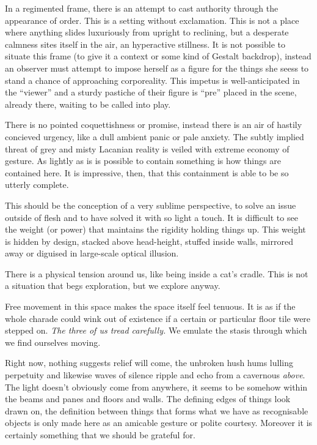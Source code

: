\documentclass{book}
\begin{document}
In a regimented frame, there is an attempt to cast authority through the
appearance of order. This is a setting without exclamation. This is not a place
where anything slides luxuriously from upright to reclining, but a desperate
calmness sites itself in the air, an hyperactive stillness. It is not possible
to situate this frame (to give it a context or some kind of Gestalt backdrop),
instead an observer must attempt to impose herself as a figure for the things
she seess to stand a chance of approaching corporeality. This impetus is
well-anticipated in the ``viewer'' and a sturdy pastiche of their figure is
``pre'' placed in the scene, already there, waiting to be called into play.

There is no pointed coquettishness or promise, instead there is an air of
hastily concieved urgency, like a dull ambient panic or pale anxiety. The
subtly implied threat of grey and misty Lacanian reality is veiled with extreme
economy of gesture. As lightly as is is possible to contain something is how
things are contained here. It is impressive, then, that this containment is
able to be so utterly complete.

This should be the conception of a very sublime perspective, to solve an issue
outside of flesh and to have solved it with so light a touch. It is difficult
to see the weight (or power) that maintains the rigidity holding things up.
This weight is hidden by design, stacked above head-height, stuffed inside
walls, mirrored away or diguised in large-scale optical illusion.

There is a physical tension around us, like being inside a cat's cradle. This
is not a situation that begs exploration, but we explore anyway.

Free movement in this space makes the space itself feel tenuous. It is as if
the whole charade could wink out of existence if a certain or particular floor
tile were stepped on.  \emph{The three of us tread carefully.} We emulate the
stasis through which we find ourselves moving.

Right now, nothing suggests relief will come, the unbroken hush hums lulling
perpetuity and likewise waves of silence ripple and echo from a cavernous
\emph{above}.  The light doesn't obviously come from anywhere, it seems to be
somehow within the beams and panes and floors and walls. The defining edges of
things look drawn on, the definition between things that forms what we have as
recognisable objects is only made here as an amicable gesture or polite
courtesy. Moreover it is certainly something that we should be grateful for.
\end{document}

